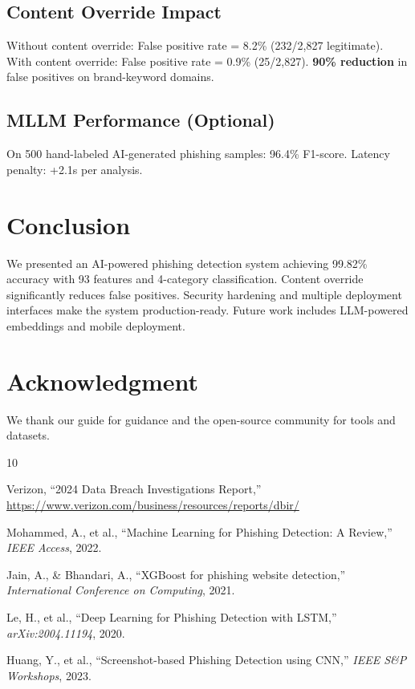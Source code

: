 \documentclass[10pt, conference]{IEEEtran}
\begin{document}
\subsection{Content Override Impact}

Without content override: False positive rate = 8.2\% (232/2,827 legitimate). With content override: False positive rate = 0.9\% (25/2,827). \textbf{90\% reduction} in false positives on brand-keyword domains.

\subsection{MLLM Performance (Optional)}

On 500 hand-labeled AI-generated phishing samples: 96.4\% F1-score. Latency penalty: +2.1s per analysis.

\section{Conclusion}

We presented an AI-powered phishing detection system achieving 99.82\% accuracy with 93 features and 4-category classification. Content override significantly reduces false positives. Security hardening and multiple deployment interfaces make the system production-ready. Future work includes LLM-powered embeddings and mobile deployment.

\section*{Acknowledgment}

We thank our guide for guidance and the open-source community for tools and datasets.


\begin{thebibliography}{10}

Verizon,
``2024 Data Breach Investigations Report,''
\url{https://www.verizon.com/business/resources/reports/dbir/}

Mohammed, A., et al.,
``Machine Learning for Phishing Detection: A Review,''
\textit{IEEE Access}, 2022.

Jain, A., \& Bhandari, A.,
``XGBoost for phishing website detection,''
\textit{International Conference on Computing}, 2021.

Le, H., et al.,
``Deep Learning for Phishing Detection with LSTM,''
\textit{arXiv:2004.11194}, 2020.

Huang, Y., et al.,
``Screenshot-based Phishing Detection using CNN,''
\textit{IEEE S\&P Workshops}, 2023.

\end{thebibliography}
\end{document}
